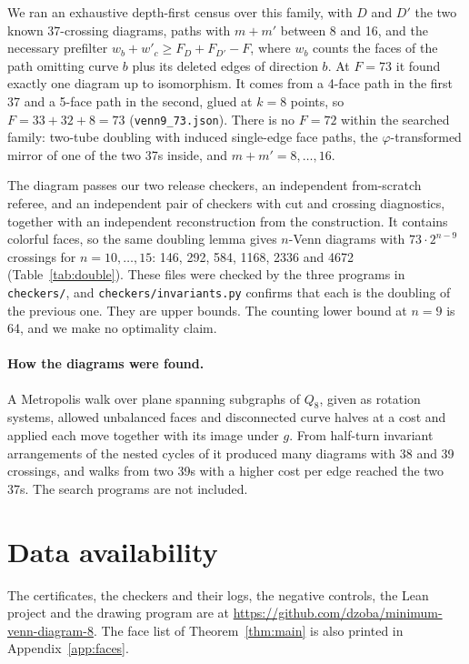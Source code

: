 \documentclass[11pt]{article}
\theoremstyle{remark}
\newcommand{\repo}{\url{https://github.com/dzoba/minimum-venn-diagram-8}}
\begin{document}
We ran an exhaustive depth-first census over this family, with $D$ and $D'$ the two known 37-crossing diagrams, paths
with $m+m'$ between 8 and 16, and the necessary prefilter $w_b+w'_c\ge F_D+F_{D'}-F$, where $w_b$ counts the faces of
the path omitting curve $b$ plus its deleted edges of direction $b$. At $F=73$ it found exactly one diagram up to
isomorphism. It comes from a 4-face path in the first 37 and a 5-face path in the second, glued at $k=8$ points, so
$F=33+32+8=73$ (\texttt{venn9\_73.json}). There is no $F=72$ within the searched family: two-tube doubling with
induced single-edge face paths, the $\varphi$-transformed mirror of one of the two 37s inside, and $m+m'=8,\dots,16$.

The diagram passes our two release checkers, an independent from-scratch referee, and an independent pair of checkers
with cut and crossing diagnostics, together with an independent reconstruction from the construction. It contains
colorful faces, so the same doubling lemma gives $n$-Venn diagrams with $73\cdot2^{n-9}$ crossings for
$n=10,\dots,15$: 146, 292, 584, 1168, 2336 and 4672 (Table~\ref{tab:double}). These files were checked by the three
programs in \texttt{checkers/}, and \texttt{checkers/invariants.py} confirms that each is the doubling of the previous
one. They are upper bounds. The counting lower bound at $n=9$ is 64, and we make no optimality claim.

\paragraph{How the diagrams were found.} A Metropolis walk over plane spanning subgraphs of $Q_8$, given as rotation
systems, allowed unbalanced faces and disconnected curve halves at a cost and applied each move together with its
image under $g$. From half-turn invariant arrangements of the nested cycles of \cite{BGMV} it produced many diagrams
with 38 and 39 crossings, and walks from two 39s with a higher cost per edge reached the two 37s. The search programs
are not included.

\section*{Data availability}
The certificates, the checkers and their logs, the negative controls, the Lean project and the drawing program are at
\repo. The face list of Theorem~\ref{thm:main} is also printed in Appendix~\ref{app:faces}.
\end{document}
